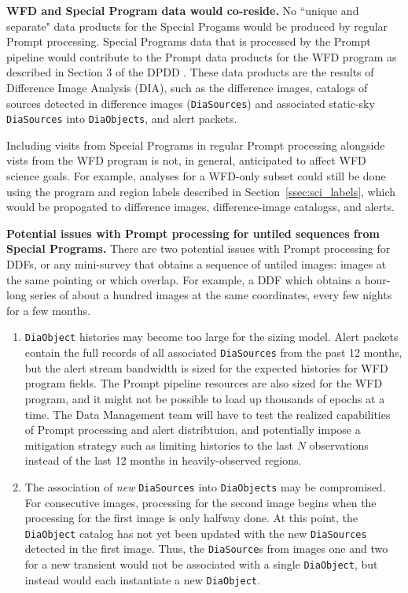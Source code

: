 \textbf{WFD and Special Program data would co-reside.}
No ``unique and separate" data products for the Special Progams would be 
produced by regular Prompt processing.
Special Programs data that is processed by the Prompt pipeline would 
contribute to the Prompt data products for the WFD program as 
described in Section 3 of the DPDD . 
These data products are the results of Difference Image Analysis (DIA),
such as the difference images, catalogs of sources detected in difference
images ({\tt DiaSources}) and associated static-sky {\tt DiaSources}
into {\tt DiaObjects}, and alert packets.

Including visits from Special Programs in regular Prompt processing alongside
vists from the WFD program is not, in general, anticipated to affect WFD science goals.
For example, analyses for a WFD-only subset could still be done using the program and
region labels described in Section~\ref{ssec:sci_labels}, which would be
propogated to difference images, difference-image catalogss, and alerts.

\textbf{Potential issues with Prompt processing for untiled sequences from Special Programs.}
There are two potential issues with Prompt processing for DDFs, or any mini-survey 
that obtains a sequence of untiled images: images at the same pointing or which overlap.
For example, a DDF which obtains a hour-long series of about a hundred images at the same coordinates,
every few nights for a few months.

\begin{enumerate}

\item {\tt DiaObject} histories may become too large for the sizing model.
Alert packets contain the full records of all associated 
{\tt DiaSources} from the past 12 months, but the alert
stream bandwidth is sized for the expected histories for
WFD program fields. 
The Prompt pipeline resources are also sized for the
WFD program, and it might not be possible to load up
thousands of epochs at a time.
The Data Management team will have to test the realized
capabilities of Prompt processing and alert distribtuion,
and potentially impose a mitigation strategy such as
limiting histories to the last $N$ observations instead
of the last 12 months in heavily-observed regions.

\item The association of {\it new} {\tt DiaSources} into {\tt DiaObjects} 
may be compromised.
For consecutive images, processing for the second image begins when the processing for the 
first image is only halfway done.
At this point, the {\tt DiaObject} catalog has 
not yet been updated with the new {\tt DiaSources} detected in the first image.
Thus, the {\tt DiaSource}s from images one and two for a new transient 
would not be associated with a single {\tt DiaObject}, but instead would 
each instantiate a new {\tt DiaObject}.

\end{enumerate}


